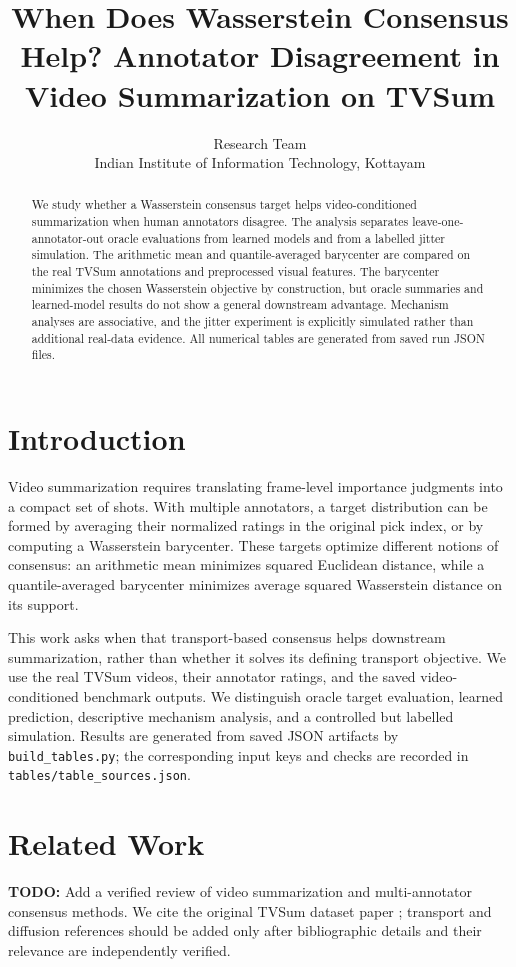 \documentclass[11pt,a4paper]{article}
\title{When Does Wasserstein Consensus Help? Annotator Disagreement in Video Summarization on TVSum}
\author{Research Team\\Indian Institute of Information Technology, Kottayam}
\date{}
\begin{document}
\maketitle

\begin{abstract}
We study whether a \BarycenterDimension{} Wasserstein consensus target helps
video-conditioned summarization when human annotators disagree. The analysis
separates leave-one-annotator-out oracle evaluations from learned models and
from a labelled jitter simulation. The arithmetic mean and quantile-averaged
barycenter are compared on the real TVSum annotations and preprocessed visual
features. The barycenter minimizes the chosen Wasserstein objective by
construction, but oracle summaries and learned-model results do not show a
general downstream advantage. Mechanism analyses are associative, and the
jitter experiment is explicitly simulated rather than additional real-data
evidence. All numerical tables are generated from saved run JSON files.
\end{abstract}

\section{Introduction}
Video summarization requires translating frame-level importance judgments
into a compact set of shots. With multiple annotators, a target distribution
can be formed by averaging their normalized ratings in the original pick
index, or by computing a Wasserstein barycenter. These targets optimize
different notions of consensus: an arithmetic mean minimizes squared
Euclidean distance, while a \BarycenterDimension{} quantile-averaged barycenter
minimizes average squared Wasserstein distance on its support.

This work asks when that transport-based consensus helps downstream
summarization, rather than whether it solves its defining transport
objective. We use the real TVSum videos, their annotator ratings, and the
saved video-conditioned benchmark outputs. We distinguish oracle target
evaluation, learned prediction, descriptive mechanism analysis, and a
controlled but labelled simulation. Results are generated from saved JSON
artifacts by \texttt{build\_tables.py}; the corresponding input keys and
checks are recorded in \texttt{tables/table\_sources.json}.

\section{Related Work}
\textbf{TODO:} Add a verified review of video summarization and multi-annotator
consensus methods. We cite the original TVSum dataset paper
\cite{song2015tvsum}; transport and diffusion references should be added only
after bibliographic details and their relevance are independently verified.
\end{document}
